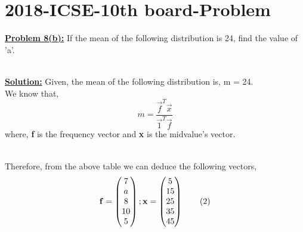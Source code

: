 \documentclass[journal,12pt,twocolumn]{IEEEtran}
\begin{document}
	\section{2018-ICSE-10th board-Problem}
\textbf{\underline{Problem 8(b):}} If the mean of the following distribution is 24, find the value of 'a'.
	\begin{table}[htb]
		\centering
	\end{table}\\
	\textbf{\underline{Solution:} }Given, the mean of the following distribution is, m = 24.\\
	We know that,
    \begin{equation} \label{main}
	    m = \frac{\vec{f}^T\vec{x}}{\vec{1}^T\vec{f}} \tag{1}
    \end{equation}
where, \textbf{f} is the frequency vector and \textbf{x} is the midvalue's vector. 
	\begin{table}[h!]
	\centering
\end{table}
\\
Therefore, from the above table we can deduce the following vectors,
	\begin{equation}
		\mathbf{f} = \begin{pmatrix}7\\a\\8\\10\\5\end{pmatrix}
		; 
	\mathbf{x} = \begin{pmatrix}5\\15\\25\\35\\45\end{pmatrix} \tag{2}
	\end{equation}
\end{document}
